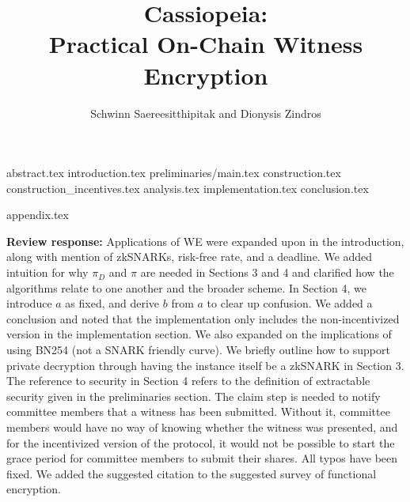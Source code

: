\documentclass[runningheads]{llncs}
\begin{document}
\title{Cassiopeia:\\
Practical On-Chain Witness Encryption
}
\author{Schwinn Saereesitthipitak and Dionysis Zindros}

\maketitle              %

{abstract.tex}
{introduction.tex}
{preliminaries/main.tex}
{construction.tex}
{construction_incentives.tex}
{analysis.tex}
{implementation.tex}
{conclusion.tex}

\nocite{momo}


{appendix.tex}

\newpage
\textbf{Review response:}
Applications of WE were expanded upon in the introduction, along with mention of zkSNARKs, risk-free rate, and a deadline.
We added intuition for why $\pi_D$ and $\pi$ are needed in Sections 3 and 4 and clarified how the algorithms relate to one another and the broader scheme.
In Section 4, we introduce $a$ as fixed, and derive $b$ from $a$ to clear up confusion.
We added a conclusion and noted that the implementation only includes the non-incentivized version in the implementation section.
We also expanded on the implications of using BN254 (not a SNARK friendly curve).
We briefly outline how to support private decryption through having the instance itself be a zkSNARK in Section 3.
The reference to security in Section 4 refers to the definition of extractable security given in the preliminaries section.
The claim step is needed to notify committee members that a witness has been submitted. Without it, committee members would have no way of knowing whether the witness was presented, and for the incentivized version of the protocol, it would not be possible to start the grace period for committee members to submit their shares.
All typos have been fixed.
We added the suggested citation to the suggested survey of functional encryption.
\end{document}
